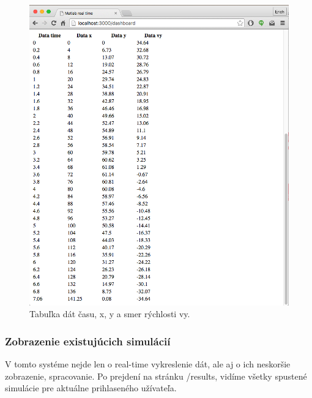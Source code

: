 \begin{figure}[H]
  \centering
  \includegraphics[scale=0.5]{img/code/angular-table.png}
  \caption{Tabuľka dát času, x, y a smer rýchlosti vy.}
  \label{img-angular-table}
\end{figure}


\subsubsection{Zobrazenie existujúcich simulácií}
V tomto systéme nejde len o real-time vykreslenie dát, ale aj o ich neskoršie zobrazenie, spracovanie. Po prejdení na stránku /results, vidíme všetky spustené simulácie pre aktuálne prihlaseného užívateľa.

